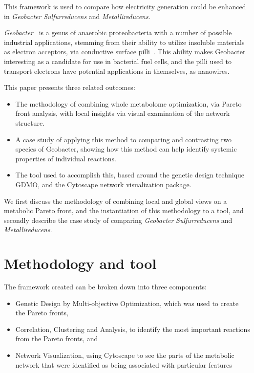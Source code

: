 \documentclass[a4paper]{article}
\begin{document}
This framework is used to compare how electricity generation could be enhanced in {\it Geobacter} {\it Sulfurreducens} and {\it Metallireducens}.

{\it Geobacter}~\cite{Lovley2011} is a genus of anaerobic proteobacteria with a number of possible industrial applications, stemming from their ability to utilize insoluble materials as electron acceptors, via conductive surface pilli~\cite{Bond2003}. This ability makes Geobacter interesting as a candidate for use in bacterial fuel cells, and the pilli used to transport electrons have potential applications in themselves, as nanowires.

This paper presents three related outcomes:
\begin{itemize}
	\item The methodology of combining whole metabolome optimization, via Pareto front analysis, with local insights via visual examination of the network structure.
	\item A case study of applying this method to comparing and contrasting two species of Geobacter, showing how this method can help identify systemic properties of individual reactions.
	\item The tool used to accomplish this, based around the genetic design technique GDMO, and the Cytoscape network visualization package.
\end{itemize}

We first discuss the methodology of combining local and global views on a metabolic Pareto front, and the instantiation of this methodology to a tool, and secondly describe the case study of comparing {\it Geobacter} {\it Sulfurreducens} and {\it Metallireducens}.

\section{Methodology and tool}
The framework created can be broken down into three components: 
\begin{itemize}
\item Genetic Design by Multi-objective Optimization, which was used to create the Pareto fronts,
\item Correlation, Clustering and Analysis, to identify the most important reactions from the Pareto fronts, and
\item Network Visualization, using Cytoscape to see the parts of the metabolic network that were identified as being associated with particular features 
\end{itemize}
\end{document}
